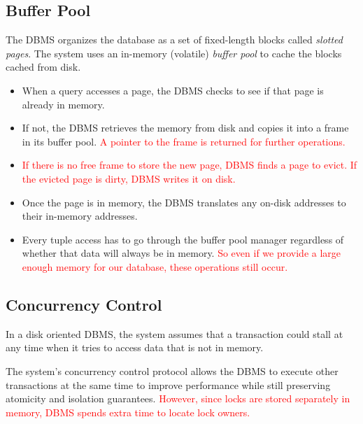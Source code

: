 \documentclass[11pt]{article}
\newcommand{\rr}[1]{\textcolor{red}{#1}}
\begin{document}
\subsection*{Buffer Pool}
The DBMS organizes the database as a set of fixed-length blocks called \textit{slotted pages}.
The system uses an in-memory (volatile) \textit{buffer pool} to cache the blocks cached from disk.

\begin{itemize}
    \item
    When a query accesses a page, the DBMS checks to see if that page is already in memory.
        
    \item
    If not, the DBMS retrieves the memory from disk and copies it into a frame in its 
    buffer pool. \rr{A pointer to the frame is returned for further operations.}
    
    \item \rr{If there is no free frame to store the new page, DBMS finds a page to evict.
    If the evicted page is dirty, DBMS writes it on disk.}
        
    \item
    Once the page is in memory, the DBMS translates any on-disk addresses to their 
    in-memory addresses.
        
    \item
    Every tuple access has to go through the buffer pool manager regardless of whether 
    that data will always be in memory. \rr{So even if we provide a large enough
    memory for our database, these operations still occur.}
\end{itemize}
    
\subsection*{Concurrency Control}
In a disk oriented DBMS, the system assumes that a transaction could stall at any time when 
it tries to access data that is not in memory.
        
The system's concurrency control protocol allows the DBMS to execute other transactions at 
the same time to improve performance while still preserving atomicity and isolation 
guarantees. \rr{However, since locks are stored separately in memory, DBMS spends extra time to
locate lock owners.}
        
\end{document}
